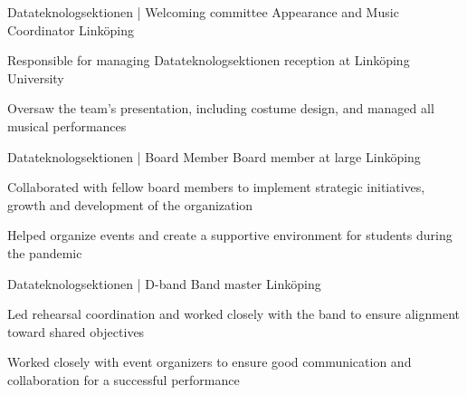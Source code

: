 

\begin{cventries}

  \cventry
    {Datateknologsektionen | Welcoming committee} %
    {Appearance and Music Coordinator} %
    {Linköping} %
    {} %
    {
      \begin{cvitems} %
        \item {Responsible for managing Datateknologsektionen reception at Linköping University}
        \item {Oversaw the team's presentation, including costume design, and managed all musical performances}
      \end{cvitems}
    }
  \cventry
    {Datateknologsektionen | Board Member} %
    {Board member at large} %
    {Linköping} %
    {} %
    {
      \begin{cvitems} %
        \item {Collaborated with fellow board members to implement strategic initiatives, growth and development of the organization}
        \item {Helped organize events and create a supportive environment for students during the pandemic}
      \end{cvitems}
    }
  \cventry
    {Datateknologsektionen | D-band} %
    {Band master} %
    {Linköping} %
    {} %
    {
      \begin{cvitems} %
        \item {Led rehearsal coordination and worked closely with the band to ensure alignment toward shared objectives}
        \item {Worked closely with event organizers to ensure good communication and collaboration for a successful performance}
      \end{cvitems}
    }
\end{cventries}